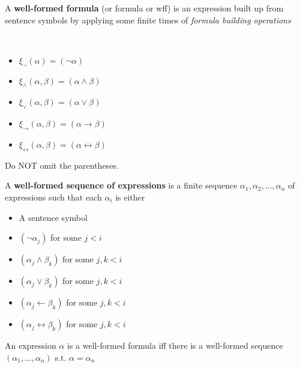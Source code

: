 \begin{definition}
    \label{def:WFF}
    A \textbf{well-formed formula} (or formula or wff) is an expression built up from sentence symbols by applying some finite times of \emph{formula building operations}
\end{definition}

\begin{definition}~{}
    \begin{itemize}
        \item $\xi_{\neg}(\alpha) = (\neg\alpha)$
        \item $\xi_{\wedge}(\alpha,\beta) = (\alpha \wedge \beta)$
        \item $\xi_{\vee}(\alpha,\beta) = (\alpha\vee\beta)$
        \item $\xi_{\rightarrow}(\alpha,\beta) = (\alpha\rightarrow\beta)$
        \item $\xi_{\leftrightarrow}(\alpha,\beta) = (\alpha\leftrightarrow\beta)$
    \end{itemize}
\end{definition}
\begin{remark}
    Do NOT omit the parentheses.
\end{remark}

\begin{definition}
    \label{def:WellFormedSeqOfExpr}
    A \textbf{well-formed sequence of expressions} is a finite sequence $\alpha_1,\alpha_2,\dots,\alpha_n$ of expressions such that each $\alpha_i$ is either
    \begin{itemize}
        \item A sentence symbol
        \item $(\neg\alpha_j)$ for some $j < i$
        \item $(\alpha_j \wedge \beta_k)$ for some $j,k<i$
        \item $(\alpha_j \vee \beta_k)$ for some $j,k<i$
        \item $(\alpha_j \leftarrow \beta_k)$ for some $j,k<i$
        \item $(\alpha_j \leftrightarrow \beta_k)$ for some $j,k<i$
    \end{itemize}
\end{definition}

\begin{proposition}
    An expression $\alpha$ is a well-formed formula iff there is a well-formed sequence $(\alpha_1,\dots,\alpha_n)$ s.t. $\alpha = \alpha_n$
\end{proposition}

